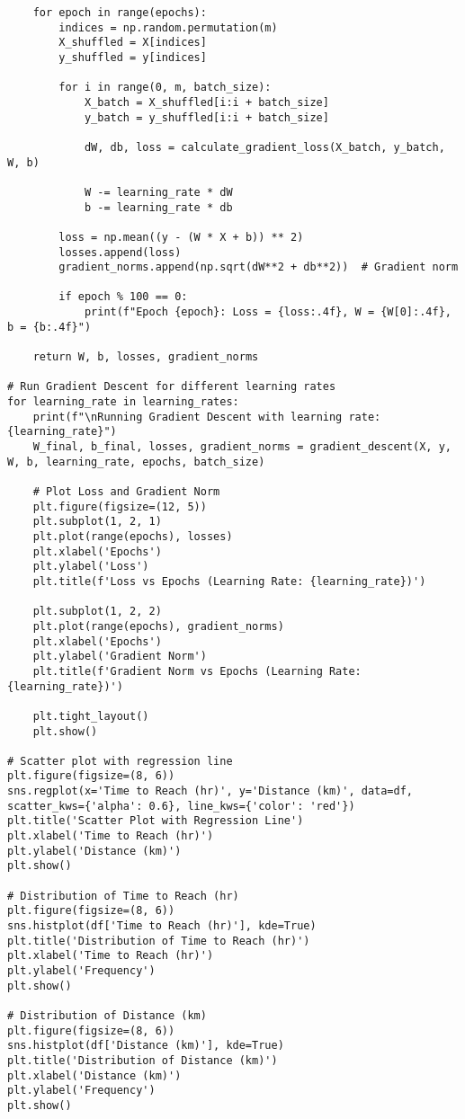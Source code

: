 \documentclass{article}
\begin{document}
\begin{verbatim}
    for epoch in range(epochs):
        indices = np.random.permutation(m)
        X_shuffled = X[indices]
        y_shuffled = y[indices]

        for i in range(0, m, batch_size):
            X_batch = X_shuffled[i:i + batch_size]
            y_batch = y_shuffled[i:i + batch_size]

            dW, db, loss = calculate_gradient_loss(X_batch, y_batch, W, b)

            W -= learning_rate * dW
            b -= learning_rate * db

        loss = np.mean((y - (W * X + b)) ** 2)
        losses.append(loss)
        gradient_norms.append(np.sqrt(dW**2 + db**2))  # Gradient norm

        if epoch % 100 == 0:
            print(f"Epoch {epoch}: Loss = {loss:.4f}, W = {W[0]:.4f}, b = {b:.4f}")

    return W, b, losses, gradient_norms

# Run Gradient Descent for different learning rates
for learning_rate in learning_rates:
    print(f"\nRunning Gradient Descent with learning rate: {learning_rate}")
    W_final, b_final, losses, gradient_norms = gradient_descent(X, y, W, b, learning_rate, epochs, batch_size)

    # Plot Loss and Gradient Norm
    plt.figure(figsize=(12, 5))
    plt.subplot(1, 2, 1)
    plt.plot(range(epochs), losses)
    plt.xlabel('Epochs')
    plt.ylabel('Loss')
    plt.title(f'Loss vs Epochs (Learning Rate: {learning_rate})')

    plt.subplot(1, 2, 2)
    plt.plot(range(epochs), gradient_norms)
    plt.xlabel('Epochs')
    plt.ylabel('Gradient Norm')
    plt.title(f'Gradient Norm vs Epochs (Learning Rate: {learning_rate})')

    plt.tight_layout()
    plt.show()

# Scatter plot with regression line
plt.figure(figsize=(8, 6))
sns.regplot(x='Time to Reach (hr)', y='Distance (km)', data=df, scatter_kws={'alpha': 0.6}, line_kws={'color': 'red'})
plt.title('Scatter Plot with Regression Line')
plt.xlabel('Time to Reach (hr)')
plt.ylabel('Distance (km)')
plt.show()

# Distribution of Time to Reach (hr)
plt.figure(figsize=(8, 6))
sns.histplot(df['Time to Reach (hr)'], kde=True)
plt.title('Distribution of Time to Reach (hr)')
plt.xlabel('Time to Reach (hr)')
plt.ylabel('Frequency')
plt.show()

# Distribution of Distance (km)
plt.figure(figsize=(8, 6))
sns.histplot(df['Distance (km)'], kde=True)
plt.title('Distribution of Distance (km)')
plt.xlabel('Distance (km)')
plt.ylabel('Frequency')
plt.show()


\end{verbatim}
\end{document}
